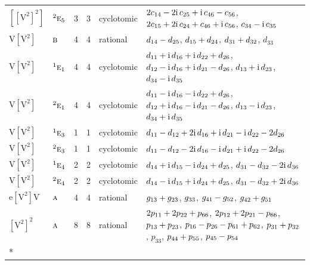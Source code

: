 \documentclass[10pt,a4paper]{article}
\numberwithin{equation}{section}
\newcommand{\irr}[1]{\text{\normalfont\scshape #1}}
\newcommand{\conjpair}[1]{{}^{#1}}
\newcommand{\iunit}{\mathrm{i}}
\newcommand{\jahn}[1]{\mathrm{#1}}
\newlength{\fillwidth}\newlength{\cellwidth}\newlength{\colwidth}
\newcommand{\signbreak}{\penalty100\relax}
\begin{document}
{\begin{longtable}{@{}llrrl>{\RaggedRight\arraybackslash}p{\fillwidth}@{}}
$\jahn{[[V^{2}]^{2}]}$ & $\conjpair{2}\irr{e}_{5}$ & 3 & 3 & cyclotomic & $2c_{14} -\signbreak 2\iunit{}\,c_{25} +\signbreak \iunit{}\,c_{46} -\signbreak c_{56}$, $2c_{15} +\signbreak 2\iunit{}\,c_{24} +\signbreak c_{46} +\signbreak \iunit{}\,c_{56}$, $c_{34} -\signbreak \iunit{}\,c_{35}$\\
$\jahn{V[V^{2}]}$ & $\irr{b}$ & 4 & 4 & rational & $d_{14} -\signbreak d_{25}$, $d_{15} +\signbreak d_{24}$, $d_{31} +\signbreak d_{32}$, $d_{33}$\\
$\jahn{V[V^{2}]}$ & $\conjpair{1}\irr{e}_{1}$ & 4 & 4 & cyclotomic & $d_{11} +\signbreak \iunit{}\,d_{16} +\signbreak \iunit{}\,d_{22} +\signbreak d_{26}$, $d_{12} -\signbreak \iunit{}\,d_{16} +\signbreak \iunit{}\,d_{21} -\signbreak d_{26}$, $d_{13} +\signbreak \iunit{}\,d_{23}$, $d_{34} -\signbreak \iunit{}\,d_{35}$\\
$\jahn{V[V^{2}]}$ & $\conjpair{2}\irr{e}_{1}$ & 4 & 4 & cyclotomic & $d_{11} -\signbreak \iunit{}\,d_{16} -\signbreak \iunit{}\,d_{22} +\signbreak d_{26}$, $d_{12} +\signbreak \iunit{}\,d_{16} -\signbreak \iunit{}\,d_{21} -\signbreak d_{26}$, $d_{13} -\signbreak \iunit{}\,d_{23}$, $d_{34} +\signbreak \iunit{}\,d_{35}$\\
$\jahn{V[V^{2}]}$ & $\conjpair{1}\irr{e}_{3}$ & 1 & 1 & cyclotomic & $d_{11} -\signbreak d_{12} +\signbreak 2\iunit{}\,d_{16} +\signbreak \iunit{}\,d_{21} -\signbreak \iunit{}\,d_{22} -\signbreak 2d_{26}$\\
$\jahn{V[V^{2}]}$ & $\conjpair{2}\irr{e}_{3}$ & 1 & 1 & cyclotomic & $d_{11} -\signbreak d_{12} -\signbreak 2\iunit{}\,d_{16} -\signbreak \iunit{}\,d_{21} +\signbreak \iunit{}\,d_{22} -\signbreak 2d_{26}$\\
$\jahn{V[V^{2}]}$ & $\conjpair{1}\irr{e}_{4}$ & 2 & 2 & cyclotomic & $d_{14} +\signbreak \iunit{}\,d_{15} -\signbreak \iunit{}\,d_{24} +\signbreak d_{25}$, $d_{31} -\signbreak d_{32} -\signbreak 2\iunit{}\,d_{36}$\\
$\jahn{V[V^{2}]}$ & $\conjpair{2}\irr{e}_{4}$ & 2 & 2 & cyclotomic & $d_{14} -\signbreak \iunit{}\,d_{15} +\signbreak \iunit{}\,d_{24} +\signbreak d_{25}$, $d_{31} -\signbreak d_{32} +\signbreak 2\iunit{}\,d_{36}$\\
$\jahn{e[V^{2}]V}$ & $\irr{a}$ & 4 & 4 & rational & $\mathnormal{g}_{13} +\signbreak \mathnormal{g}_{23}$, $\mathnormal{g}_{33}$, $\mathnormal{g}_{41} -\signbreak \mathnormal{g}_{52}$, $\mathnormal{g}_{42} +\signbreak \mathnormal{g}_{51}$\\
$\jahn{[V^{2}]^{2}}$ & $\irr{a}$ & 8 & 8 & rational & $2p_{11} +\signbreak 2p_{22} +\signbreak p_{66}$, $2p_{12} +\signbreak 2p_{21} -\signbreak p_{66}$, $p_{13} +\signbreak p_{23}$, $p_{16} -\signbreak p_{26} -\signbreak p_{61} +\signbreak p_{62}$, $p_{31} +\signbreak p_{32}$, $p_{33}$, $p_{44} +\signbreak p_{55}$, $p_{45} -\signbreak p_{54}$\\*

\end{longtable}}
\end{document}
